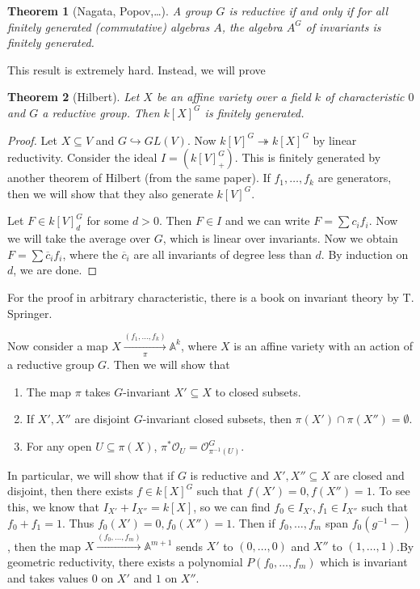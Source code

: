\documentclass[leqno, openany]{memoir}
\newtheorem{thm}{Theorem}[section]
\theoremstyle{definition}
\theoremstyle{remark}
\theoremstyle{plain}
\theoremstyle{definition}
\theoremstyle{remark}
\newcommand{\A}{\mathbb{A}}
\newcommand{\mc}[1]{\mathcal{#1}}
\newcommand{\ol}[1]{\overline{#1}}
\begin{document}
\begin{thm}[Nagata, Popov,\ldots]
    A group $G$ is reductive if and only if for all finitely generated (commutative) algebras $A$, the algebra $A^G$ of invariants is finitely generated.
\end{thm}

This result is extremely hard. Instead, we will prove
\begin{thm}[Hilbert]
    Let $X$ be an affine variety over a field $k$ of characteristic $0$ and $G$ a reductive group. Then ${k[X]}^G$ is finitely generated.
\end{thm}

\begin{proof}
    Let $X \subseteq V$ and $G \hookrightarrow GL(V)$. Now ${k[V]}^G \twoheadrightarrow {k[X]}^G$ by linear reductivity. Consider the ideal $I = ({k[V]}_+^G)$. This is finitely generated by another theorem of Hilbert (from the same paper). If $f_1, \ldots, f_k$ are generators, then we will show that they also generate ${k[V]}^G$.

    Let $F \in {k[V]}_d^G$ for some $d > 0$. Then $F \in I$ and we can write $F = \sum c_i f_i$. Now we will take the average over $G$, which is linear over invariants. Now we obtain $F = \sum \ol{c}_i f_i$, where the $\ol{c}_i$ are all invariants of degree less than $d$. By induction on $d$, we are done.
\end{proof}

For the proof in arbitrary characteristic, there is a book on invariant theory by T. Springer.

Now consider a map $X \xrightarrow[\pi]{(f_1, \ldots, f_k)} \A^k$, where $X$ is an affine variety with an action of a reductive group $G$. Then we will show that
\begin{enumerate}
    \item The map $\pi$ takes $G$-invariant $X' \subseteq X$ to closed subsets.
    \item If $X', X''$ are disjoint $G$-invariant closed subsets, then $\pi(X') \cap \pi(X'') = \emptyset$.
    \item For any open $U \subseteq \pi(X)$, $\pi^* \mc{O}_U = \mc{O}_{\pi^{-1}(U)}^G$.
\end{enumerate}

In particular, we will show that if $G$ is reductive and $X', X'' \subseteq X$ are closed and disjoint, then there exists $f \in {k[X]}^G$ such that $f(X') = 0, f(X'') = 1$. To see this, we know that $I_{X'} + I_{X''} = k[X]$, so we can find $f_0 \in I_{X'}, f_1 \in I_{X''}$ such that $f_0 + f_1 = 1$. Thus $f_0(X') = 0, f_0(X'') = 1$. Then if $f_0, \ldots, f_m$ span $f_0(g^{-1}-)$, then the map $X \xrightarrow{(f_0, \ldots, f_m)} \A^{m+1}$ sends $X'$ to $(0, \ldots, 0)$ and $X''$ to $(1, \ldots, 1)$.By geometric reductivity, there exists a polynomial $P(f_0, \ldots, f_m)$ which is invariant and takes values $0$ on $X'$ and $1$ on $X''$.
\end{document}
